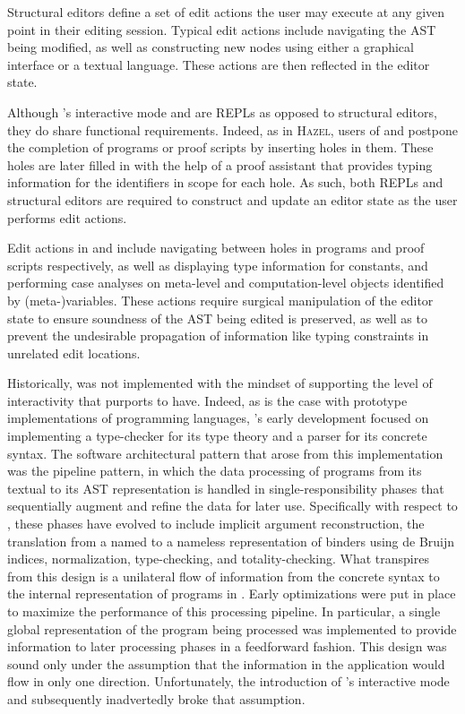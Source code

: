 Structural editors define a set of edit actions the user may execute at any given point in their editing session.
Typical edit actions include navigating the AST being modified, as well as constructing new nodes using either a graphical interface or a textual language.
These actions are then reflected in the editor state.

Although \Beluga's interactive mode and \Harpoon are \acp{REPL} as opposed to structural editors, they do share functional requirements.
Indeed, as in \textsc{Hazel}, users of \Beluga and \Harpoon postpone the completion of programs or proof scripts by inserting holes in them.
These holes are later filled in with the help of a proof assistant that provides typing information for the identifiers in scope for each hole.
As such, both \acp{REPL} and structural editors are required to construct and update an editor state as the user performs edit actions.

Edit actions in \Beluga and \Harpoon include navigating between holes in programs and proof scripts respectively, as well as displaying type information for constants, and performing case analyses on meta-level and computation-level objects identified by (meta-)variables.
These actions require surgical manipulation of the editor state to ensure soundness of the \ac{AST} being edited is preserved, as well as to prevent the undesirable propagation of information like typing constraints in unrelated edit locations.

Historically, \Beluga was not implemented with the mindset of supporting the level of interactivity that \Harpoon purports to have.
Indeed, as is the case with prototype implementations of programming languages, \Beluga's early development focused on implementing a type-checker for its type theory and a parser for its concrete syntax.
The software architectural pattern that arose from this implementation was the pipeline pattern, in which the data processing of programs from its textual to its \ac{AST} representation is handled in single-responsibility phases that sequentially augment and refine the data for later use.
Specifically with respect to \Beluga, these phases have evolved to include implicit argument reconstruction, the translation from a named to a nameless representation of binders using de Bruijn indices, normalization, type-checking, and totality-checking.
What transpires from this design is a unilateral flow of information from the concrete syntax to the internal representation of programs in \Beluga.
Early optimizations were put in place to maximize the performance of this processing pipeline.
In particular, a single global representation of the \Beluga program being processed was implemented to provide information to later processing phases in a feedforward fashion.
This design was sound only under the assumption that the information in the application would flow in only one direction.
Unfortunately, the introduction of \Beluga's interactive mode and subsequently \Harpoon inadvertedly broke that assumption.

